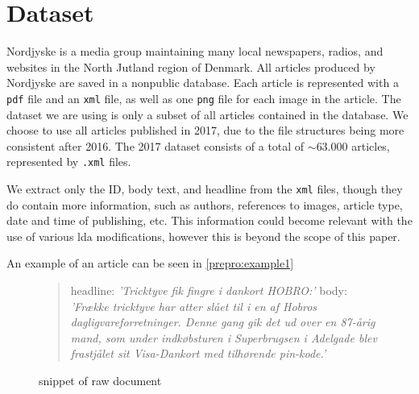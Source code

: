 \section{Dataset}\label{sec:dataset}
Nordjyske is a media group maintaining many local newspapers, radios, and websites in the North Jutland region of Denmark.
All articles produced by Nordjyske are saved in a nonpublic database.
Each article is represented with a \texttt{pdf} file and an \texttt{xml} file, as well as one \texttt{png} file for each image in the article.
The dataset we are using is only a subset of all articles contained in the database.
We choose to use all articles published in 2017, due to the file structures being more consistent after 2016.
The 2017 dataset consists of a total of $\sim 63.000$ articles, represented by \texttt{.xml} files.

We extract only the ID, body text, and headline from the \texttt{xml} files, though they do contain more information, such as authors, references to images, article type, date and time of publishing, etc.
This information could become relevant with the use of various \gls{lda} modifications, however this is beyond the scope of this paper.

An example of an article can be seen in \autoref{prepro:example1}

\begin{figure}[h]
	\begin{framed}
		\begin{quote}
			headline: \textit{'Tricktyve fik fingre i dankort HOBRO:'}
			body: \textit{'Frække tricktyve har atter slået til i en af Hobros dagligvareforretninger. Denne gang gik det ud over en 87-årig mand, som under indkøbsturen i Superbrugsen i Adelgade blev frastjålet sit Visa-Dankort med tilhørende pin-kode.'}
		\end{quote}
	\end{framed}
		\caption{snippet of raw document}
		\label{prepro:example1}
\end{figure}
